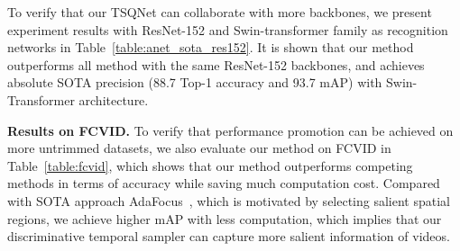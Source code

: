 \documentclass[runningheads]{llncs}
\newcommand{\tabref}[1]{Table~\ref{#1}}
\begin{document}
 
To verify that our TSQNet can collaborate with more backbones, we present experiment results with ResNet-152 and Swin-transformer \cite{swintransformer} family as recognition networks in \tabref{table:anet_sota_res152}. It is shown that our method outperforms all method with the same ResNet-152 backbones, and achieves absolute SOTA precision (88.7 Top-1 accuracy and 93.7 mAP) with Swin-Transformer architecture.








\noindent \textbf{Results on FCVID.}
To verify that performance promotion can be achieved on more untrimmed datasets, we also evaluate our method on FCVID in \tabref{table:fcvid}, which shows that our method outperforms competing methods in terms of accuracy while saving much computation cost. 
Compared with SOTA approach AdaFocus~\cite{adafocus}, which is motivated by selecting salient spatial regions, we achieve higher mAP with less computation, which implies that our discriminative temporal sampler can capture more salient information of videos.
\end{document}
